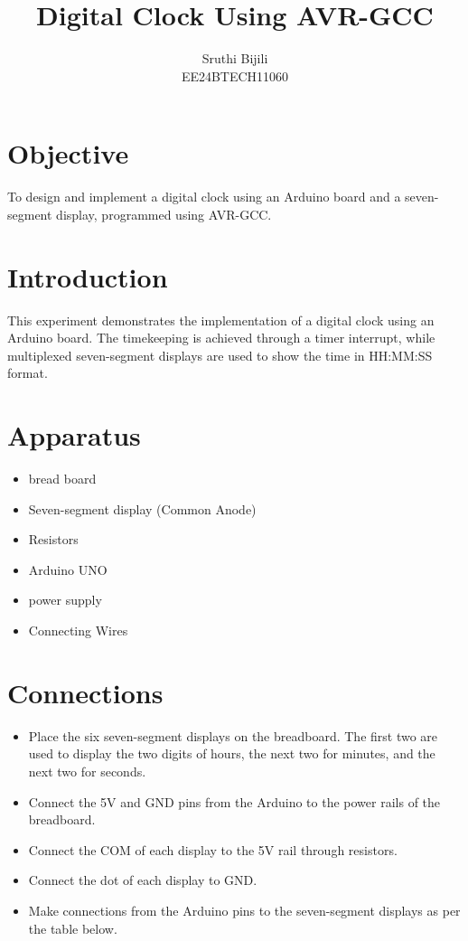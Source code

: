 \documentclass[12pt,a4paper]{article}
\title{\textbf{Digital Clock Using AVR-GCC}}
\author{Sruthi Bijili \\EE24BTECH11060}
\begin{document}
\maketitle

\section{Objective}
To design and implement a digital clock using an Arduino board and a seven-segment display, programmed using AVR-GCC.

\section{Introduction}
This experiment demonstrates the implementation of a digital clock using an Arduino board. The timekeeping is achieved through a timer interrupt, while multiplexed seven-segment displays are used to show the time in HH:MM:SS format.

\section{Apparatus}
\begin{itemize}
\item bread board
\item Seven-segment display (Common Anode)
\item Resistors
\item Arduino UNO
\item power supply
\item Connecting Wires
\end{itemize}
\section{Connections}
\begin{itemize}
\item Place the six seven-segment displays on the breadboard. The first two are used to display the two digits of hours, the next two for minutes, and the next two for seconds.
    \item Connect the 5V and GND pins from the Arduino to the power rails of the breadboard.
    \item Connect the COM of each display to the 5V rail through resistors.
    \item Connect the dot of each display to GND.
    \item Make connections from the Arduino pins to the seven-segment displays as per the table below.
\end{itemize}

\end{document}
